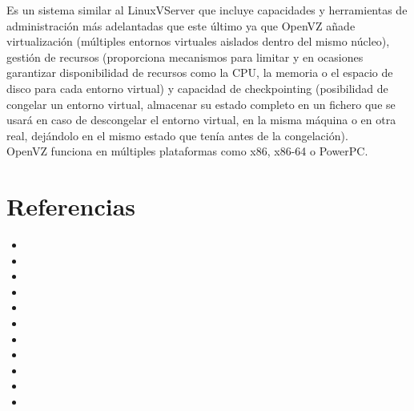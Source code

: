 \documentclass[10pt,a4paper,spanish]{report}
\begin{document}
  \noindent
  Es un sistema similar al LinuxVServer que incluye capacidades y herramientas de administración más adelantadas que este último ya que OpenVZ añade virtualización (múltiples entornos virtuales aislados dentro del mismo núcleo), gestión de recursos (proporciona mecanismos para limitar y en ocasiones garantizar disponibilidad de recursos como la CPU, la memoria o el espacio de disco para cada entorno virtual) y capacidad de checkpointing (posibilidad de congelar un entorno virtual, almacenar su estado completo en un fichero que se usará en caso de descongelar el entorno virtual, en la misma máquina o en otra real, dejándolo en el mismo estado que tenía antes de la congelación). \\

  \noindent
  OpenVZ funciona en múltiples plataformas como x86, x86-64 o PowerPC.


\chapter{Referencias}

  \begin{itemize}
    \item {}

    \item {}


    \item {}

    \item {}

    \item {}

    \item {}

    \item {}

    \item {}

    \item {}

    \item {}

    \item {}
  \end{itemize}
\end{document}
